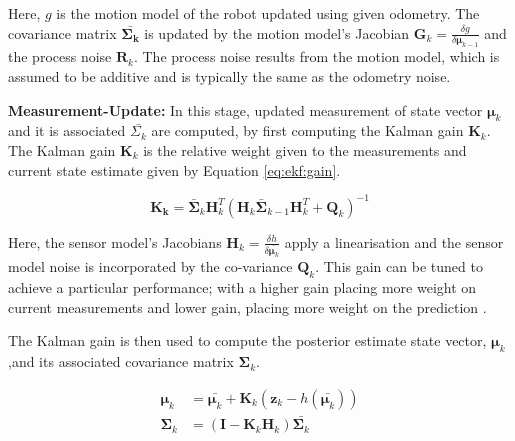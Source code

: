 Here, $g$ is the motion model of the robot updated using given odometry. The covariance matrix $\mathbf{\bar{\Sigma_k}}$ is updated by the motion model's Jacobian $\mathbf{G}_k = \frac{\delta g }{ \delta \mathbf{\mu}_{k-1}}$ and the process noise $\mathbf{R}_k$. The process noise results from the motion model, which is assumed to be additive and is typically the same as the odometry noise.


\textbf{Measurement-Update:} In this stage, updated measurement of state vector ${\mathbf{\mu}_k}$ and it is associated ${\bar{\Sigma_k}}$ are computed, by first computing the Kalman gain $\mathbf{K}_k$. The Kalman gain $\mathbf{K}_k$ is the relative weight given to the measurements and current state estimate given by Equation \ref{eq:ekf:gain}.


\begin{equation}
	\mathbf{K_k} = \bar{\mathbf{\Sigma}}_k \mathbf{H}_{k}^T(\mathbf{H}_k\bar{\mathbf{\Sigma}}_{k-1}\mathbf{H}_{k}^T+\mathbf{Q}_k)^{-1}
	\label{eq:ekf:gain}
\end{equation}

Here, the sensor model's Jacobians $\mathbf{H}_k = \frac{\delta h}{\delta \bar{\mathbf{\mu}_k}}$ apply a linearisation and the sensor model noise is incorporated by the co-variance $\mathbf{Q}_k$. This gain can be tuned to achieve a particular performance; with a higher gain placing more weight on current measurements and lower gain, placing more weight on the prediction \cite{Thrun2006}. 

The Kalman gain is then used to compute the posterior estimate state vector, $ \mathbf{\mu}_k$,and its associated covariance matrix $\mathbf{\Sigma}_k$.

\begin{equation}
\begin{split}
    \mathbf{\mu}_k &= \bar{\mathbf{\mu}_k} + \mathbf{K}_k(\mathbf{z}_k-h(\bar{\mathbf{\mu}_k}))\\
	\mathbf{\Sigma}_k &= (\mathbf{I} -\mathbf{K}_k \mathbf{H}_k)\bar{\mathbf{\Sigma}_k}
\end{split}
	\label{eq:ekf:measure}
\end{equation}

